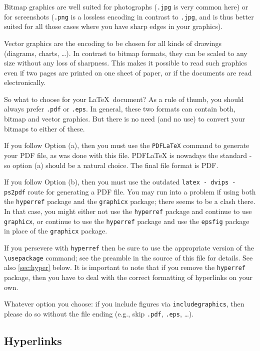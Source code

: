 \documentclass{article}
\begin{document}
Bitmap graphics are well suited for photographs (\texttt{.jpg} is very common here) or for screenshots (\texttt{.png} is a lossless encoding in contrast to \texttt{.jpg}, and is thus better suited for all those cases where you have sharp edges in your graphics).

Vector graphics are the encoding to be chosen for all kinds of drawings (diagrams, charts, \ldots). In contrast to bitmap formats, they can be scaled to any size without any loss of sharpness. This makes it possible to read such graphics even if two pages are printed on one sheet of paper, or if the documents are read electronically.

So what to choose for your \LaTeX\ document? As a rule of thumb, you should always prefer \texttt{.pdf} or \texttt{.eps}.
In general, these two formats can contain both, bitmap and vector graphics. But there is no need (and no use) to convert your bitmaps to either of these.

If you follow Option (a), then you must use the \texttt{PDFLaTeX} command to generate your PDF file, as was done with this file. PDFLaTeX is nowadays the standard - so option (a) should be a natural choice. The final file format is PDF.

If you follow Option (b), then you must use the outdated \texttt{latex - dvips - ps2pdf} route for generating a PDF file. You may run into a problem if using both the \texttt{hyperref} package and the \texttt{graphicx} package; there seems to be a clash there.
In that case, you might either not use the \texttt{hyperref} package and continue to use \texttt{graphicx}, or continue to use the \texttt{hyperref} package and use the \texttt{epsfig} package in place of the \texttt{graphicx} package.

If you persevere with \texttt{hyperref} then be sure to use the appropriate version of the \verb+\usepackage+ command; see the preamble in the source of this file for details. See also \autoref{sec:hyper} below. It is important to note that if you remove the \texttt{hyperref} package, then you have to deal with the correct formatting of hyperlinks on your own.

Whatever option you choose: if you include figures via \texttt{includegraphics}, then please do so without the file ending (e.g., skip \texttt{.pdf}, \texttt{.eps}, \ldots).

\subsection{Hyperlinks}
\label{sec:hyper}
\end{document}
